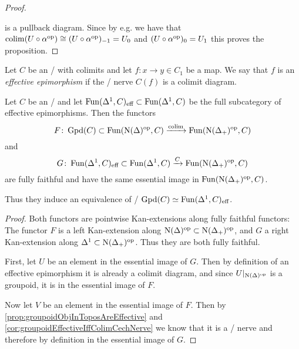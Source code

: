 \begin{prop}
\begin{proof}
\begin{center}
        \end{center}
        is a pullback diagram.
        Since by e.g. \cite[Lemma 6.1.3.17]{HTT} we have that $\operatorname{colim} (U\circ\alpha^{\operatorname{op}})\cong(U\circ\alpha^{\operatorname{op}})_{-1} = U_0$ and $(U\circ\alpha^{\operatorname{op}})_0=U_1$ this proves the proposition.
    \end{proof}
\end{prop}
\begin{definition}
    Let $C$ be an \inftycat/ with colimits and let $f\colon x\to y\in C_1$ be a map.
    We say that $f$ is an \emph{effective epimorphism} if the \Cech/ nerve $C(f)$ is a colimit diagram.
\end{definition}
\begin{prop}\label{prop:mayRecognitionTheoremGroupoid}
    Let $C$ be an \inftytop/ and let $\operatorname{Fun}(\Delta^1,C)_{\text{eff}}\subset\operatorname{Fun}(\Delta^1,C)$ be the full subcategory of effective epimorphisms.  
    Then the functors
    \begin{equation*}
        F\colon\operatorname{Gpd}(C)\subset\operatorname{Fun}(\operatorname{N}(\Delta)^{\operatorname{op}},C)\xrightarrow{\operatorname{colim}}\operatorname{Fun}(\operatorname{N}(\Delta_+)^{\operatorname{op}},C)
    \end{equation*}
    and 
    \begin{equation*}
        G\colon\operatorname{Fun}(\Delta^1,C)_{\text{eff}}\subset\operatorname{Fun}(\Delta^1,C)\xrightarrow{C}\operatorname{Fun}(\operatorname{N}(\Delta_+)^{\operatorname{op}},C)
    \end{equation*}
    are fully faithful and have the same essential image in $\operatorname{Fun}(\operatorname{N}(\Delta_+)^{\operatorname{op}},C)$.
    
    Thus they induce an equivalence of \inftycats/ $\operatorname{Gpd}(C)\simeq\operatorname{Fun}(\Delta^1,C)_{\text{eff}}$.
    \begin{proof}
        Both functors are pointwise Kan-extensions along fully faithful functors:
        The functor $F$ is a left Kan-extension along $\operatorname{N}(\Delta)^{\operatorname{op}}\subset\operatorname{N}(\Delta_+)^{\operatorname{op}}$, and $G$ a right Kan-extension along $\Delta^1\subset\operatorname{N}(\Delta_+)^{\operatorname{op}}$.
        Thus they are both fully faithful.

        First, let $U$ be an element in the essential image of $G$. 
        Then by definition of an effective epimorphism it is already a colimit diagram, and since $U|_{\operatorname{N}(\Delta)^{\operatorname{op}}}$ is a groupoid, it is in the essential image of $F$.

        Now let $V$ be an element in the essential image of $F$. 
        Then by \cref{prop:groupoidObjInToposAreEffective} and \cref{cor:groupoidEffectiveIffColimCechNerve} we know that it is a \Cech/ nerve and therefore by definition in the essential image of $G$.
    \end{proof}
\end{prop}

